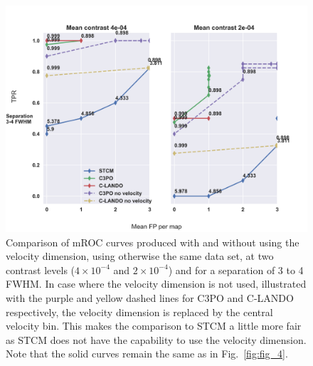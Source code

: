 \documentclass{aa}
\begin{document}
\begin{figure}
    \centering
    \includegraphics[width=\textwidth]{Fig6_final_September.png}
    \caption{Comparison of mROC curves produced with and without using the velocity dimension, using otherwise the same data set, at two contrast levels ($4\times 10^{-4}$ and $2\times 10^{-4}$) and for a separation of 3 to 4 FWHM. In case where the velocity dimension is not used, illustrated with the purple and yellow dashed lines for C3PO and C-LANDO respectively, the velocity dimension is replaced by the central velocity bin. This makes the comparison to STCM a little more fair as STCM does not have the capability to use the velocity dimension.
    Note that the solid curves remain the same as in Fig.~\ref{fig:fig_4}.
    }
    \label{fig:novel_roc}
\end{figure}
\end{document}
